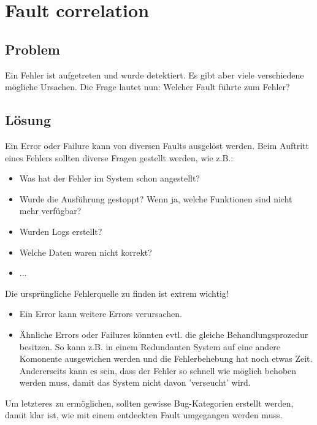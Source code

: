 
\section{Fault correlation}


\subsection{Problem}

Ein Fehler ist aufgetreten und wurde detektiert. Es gibt aber viele verschiedene mögliche Ursachen.
Die Frage lautet nun: Welcher Fault führte zum Fehler?

\subsection{Lösung}


Ein Error oder Failure kann von diversen Faults ausgelöst werden. Beim Auftritt eines Fehlers sollten diverse Fragen gestellt werden, wie z.B.:
\begin{itemize}
	\item Was hat der Fehler im System schon angestellt?
	\item Wurde die Ausführung gestoppt? Wenn ja, welche Funktionen sind nicht mehr verfügbar?
	\item Wurden Logs erstellt?
	\item Welche Daten waren nicht korrekt?
	\item ...
\end{itemize}

Die ursprüngliche Fehlerquelle zu finden ist extrem wichtig!
\begin{itemize}
	\item Ein Error kann weitere Errors verursachen.
	\item Ähnliche Errors oder Failures könnten evtl. die gleiche Behandlungsprozedur besitzen. So kann z.B. in einem Redundanten System auf eine andere Komonente ausgewichen werden und die Fehlerbehebung hat noch etwas Zeit. Andererseits kann es sein, dass der Fehler so schnell wie möglich behoben werden muss, damit das System nicht davon 'verseucht' wird.
\end{itemize}

Um letzteres zu ermöglichen, sollten gewisse Bug-Kategorien erstellt werden, damit klar ist, wie mit einem entdeckten Fault umgegangen werden muss.
